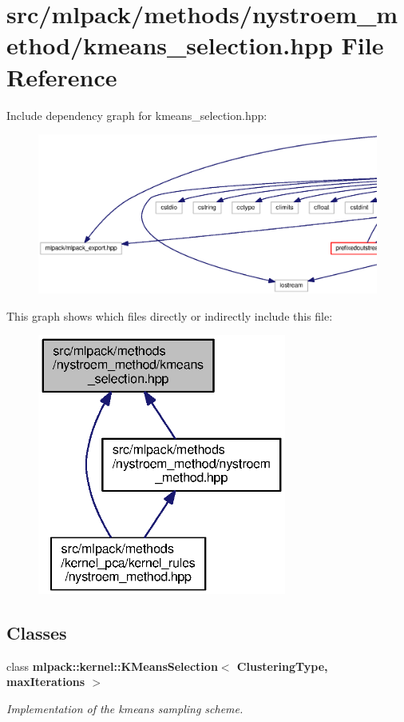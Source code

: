 \section{src/mlpack/methods/nystroem\+\_\+method/kmeans\+\_\+selection.hpp File Reference}
\label{kmeans__selection_8hpp}
Include dependency graph for kmeans\+\_\+selection.\+hpp\+:
\nopagebreak
\begin{figure}[H]
\begin{center}
\leavevmode
\includegraphics[width=350pt]{kmeans__selection_8hpp__incl}
\end{center}
\end{figure}
This graph shows which files directly or indirectly include this file\+:
\nopagebreak
\begin{figure}[H]
\begin{center}
\leavevmode
\includegraphics[width=232pt]{kmeans__selection_8hpp__dep__incl}
\end{center}
\end{figure}
\subsection*{Classes}
\begin{DoxyCompactItemize}
\item 
class {\bf mlpack\+::kernel\+::\+K\+Means\+Selection$<$ Clustering\+Type, max\+Iterations $>$}
\begin{DoxyCompactList}\small\item\em Implementation of the kmeans sampling scheme. \end{DoxyCompactList}\end{DoxyCompactItemize}
